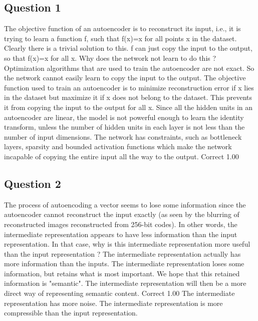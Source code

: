 \newpage \subsection*{Question 1}
The objective function of an autoencoder is to reconstruct its input, i.e., it is trying to learn a function f, such that f(x)=x for all points x in the dataset. Clearly there is a trivial solution to this. f can just copy the input to the output, so that f(x)=x for all x. Why does the network not learn to do this ?
Optimization algorithms that are used to train the autoencoder are not exact. So the network cannot easily learn to copy the input to the output.			
The objective function used to train an autoencoder is to minimize reconstruction error if x lies in the dataset but maximize it if x does not belong to the dataset. This prevents it from copying the input to the output for all x.			
Since all the hidden units in an autoencoder are linear, the model is not powerful enough to learn the identity transform, unless the number of hidden units in each layer is not less than the number of input dimensions.			
The network has constraints, such as bottleneck layers, sparsity and bounded activation functions which make the network incapable of copying the entire input all the way to the output.	Correct	1.00	

\newpage \subsection*{Question 2}
The process of autoencoding a vector seems to lose some information since the autoencoder cannot reconstruct the input exactly (as seen by the blurring of reconstructed images reconstructed from 256-bit codes). In other words, the intermediate representation appears to have less information than the input representation. In that case, why is this intermediate representation more useful than the input representation ?
The intermediate representation actually has more information than the inputs.			
The intermediate representation loses some information, but retains what is most important. We hope that this retained information is "semantic". The intermediate representation will then be a more direct way of representing semantic content.	Correct	1.00	
The intermediate representation has more noise.			
The intermediate representation is more compressible than the input representation.			

